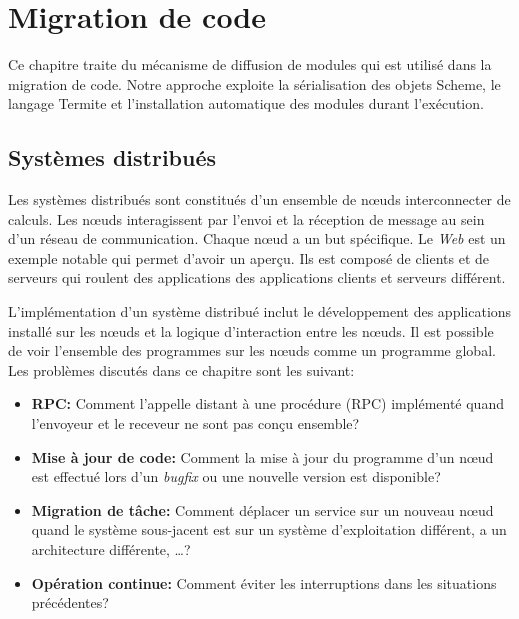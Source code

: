\chapter{Migration de code}
\label{ch:task_migration}

Ce chapitre traite du mécanisme de diffusion de modules qui est utilisé dans
la migration de code. Notre approche exploite la sérialisation des objets
Scheme, le langage Termite et l'installation automatique des modules durant
l'exécution.

\section{Systèmes distribués}

Les systèmes distribués sont constitués d'un ensemble de nœuds interconnecter
de calculs. Les nœuds interagissent par l'envoi et la réception de message
au sein d'un réseau de communication. Chaque nœud a un but spécifique. Le
\textit{Web} est un exemple notable qui permet d'avoir un aperçu.
Ils est composé de clients et de serveurs qui roulent des applications
des applications clients et serveurs différent.

L'implémentation d'un système distribué inclut le développement des applications
installé sur les nœuds et la logique d'interaction entre les nœuds. Il est
possible de voir l'ensemble des programmes sur les nœuds comme un programme
global. Les problèmes discutés dans ce chapitre sont les suivant:

\begin{itemize}

  \item {\bf RPC:} Comment l'appelle distant à une procédure (RPC)
    implémenté quand l'envoyeur et le receveur ne sont pas conçu
    ensemble?

  \item {\bf Mise à jour de code:} Comment la mise à jour du programme d'un
    nœud est effectué lors d'un \textit{bugfix} ou une nouvelle
    version est disponible?

  \item {\bf Migration de tâche:} Comment déplacer un service sur un nouveau
    nœud quand le système sous-jacent est sur un système d'exploitation
    différent, a un architecture différente, \dots?

  \item {\bf Opération continue:} Comment éviter les interruptions dans les
    situations précédentes?

\end{itemize}

